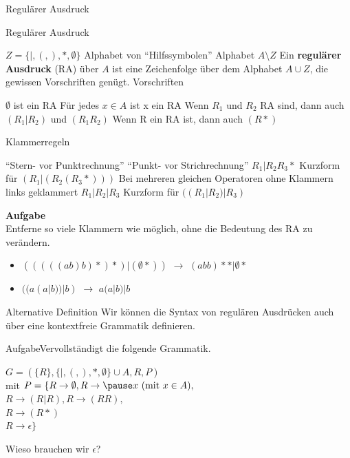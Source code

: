 \documentclass{beamer}
\begin{document}
\begin{frame}{Regulärer Ausdruck}
\begin{block}{Regulärer Ausdruck}
	\begin{itemize}
		\pitem $Z = \{ |, (,), *, \emptyset\}$ Alphabet von ``Hilfssymbolen''
		\pitem Alphabet $A \setminus Z$
		\pitem Ein \textbf{regulärer Ausdruck} (RA) über $A$ ist eine Zeichenfolge über dem Alphabet $A \cup Z$, die gewissen Vorschriften genügt.
		\pitem Vorschriften
		\begin{itemize}
			\pitem $\emptyset$ ist ein RA
			\pitem Für jedes $x \in A$ ist x ein RA
			\pitem Wenn $R_1$ und $R_2$ RA sind, dann auch $(R_1|R_2)$ und $(R_1R_2)$
			\pitem Wenn R ein RA ist, dann auch $(R*)$
		\end{itemize}
	\end{itemize}
\end{block}
\end{frame}

\begin{frame}{Klammerregeln}
\begin{itemize}
\pitem ``Stern- vor Punktrechnung''
\pitem ``Punkt- vor Strichrechnung''
\pitem[$\rightarrow$]$R_1|R_2R_3*$ Kurzform für $(R_1|(R_2(R_3*)))$
\pitem Bei mehreren gleichen Operatoren ohne Klammern links geklammert
\pitem[$\rightarrow$] $R_1|R_2|R_3$ Kurzform für $((R_1|R_2)|R_3)$
\end{itemize}
\pause
\textbf{Aufgabe}\\
Entferne so viele Klammern wie möglich, ohne die Bedeutung des RA zu verändern.\\
\begin{itemize}
\item $(((((ab)b)*)*)|(\emptyset*))$ \pause $\rightarrow$ $(abb)**|\emptyset*$ \pause
\item $((a(a|b))|b)$ \pause  $\rightarrow$ $a(a|b)|b$
\end{itemize}
\end{frame}

\begin{frame}{Alternative Definition}
Wir können die Syntax von regulären Ausdrücken auch über eine kontextfreie Grammatik definieren. \\ \vspace{0.2cm}
\begin{taskblock}{Aufgabe}Vervollständigt die folgende Grammatik.\end{taskblock}
$G = (\{R\}, \{|,(,),*,\emptyset\} \cup A, R, P)$\\
mit $P =\{R\rightarrow \emptyset, R \rightarrow \pause x \text{ }(\text{mit } x \in A),$\\$
R \rightarrow (R|R), R \rightarrow (RR),$\\$
R \rightarrow(R*)$\\$
R \rightarrow \epsilon\}$

\pause

\vspace{.4cm} 
Wieso brauchen wir $\epsilon$?
\end{frame}
\end{document}
